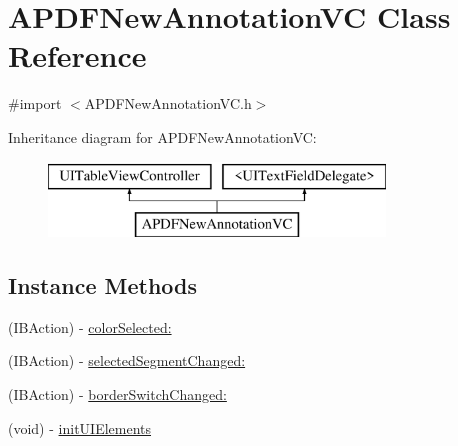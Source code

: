 \hypertarget{interface_a_p_d_f_new_annotation_v_c}{\section{A\-P\-D\-F\-New\-Annotation\-V\-C Class Reference}
\label{interface_a_p_d_f_new_annotation_v_c}
}


{\ttfamily \#import $<$A\-P\-D\-F\-New\-Annotation\-V\-C.\-h$>$}

Inheritance diagram for A\-P\-D\-F\-New\-Annotation\-V\-C\-:\begin{figure}[H]
\begin{center}
\leavevmode
\includegraphics[height=2.000000cm]{interface_a_p_d_f_new_annotation_v_c}
\end{center}
\end{figure}
\subsection*{Instance Methods}
\begin{DoxyCompactItemize}
\item 
(I\-B\-Action) -\/ \hyperlink{interface_a_p_d_f_new_annotation_v_c_ab714d4076f3aefb2235368d88278c7b8}{color\-Selected\-:}
\item 
(I\-B\-Action) -\/ \hyperlink{interface_a_p_d_f_new_annotation_v_c_afeec794d0d7686edabba1ec6363a2cd8}{selected\-Segment\-Changed\-:}
\item 
(I\-B\-Action) -\/ \hyperlink{interface_a_p_d_f_new_annotation_v_c_a3a63d26b6d752008566d0eea90a32d17}{border\-Switch\-Changed\-:}
\item 
(void) -\/ \hyperlink{interface_a_p_d_f_new_annotation_v_c_a5b3794f4bd1e1a3edadd61affd9fff9c}{init\-U\-I\-Elements}
\end{DoxyCompactItemize}
